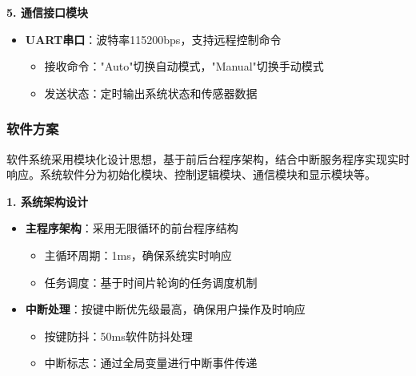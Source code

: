 \textbf{5. 通信接口模块}
\begin{itemize}
    \vspace{-6pt}
  \item \textbf{UART串口}：波特率115200bps，支持远程控制命令
    \begin{itemize}
        \vspace{-3pt}
      \item 接收命令："Auto"切换自动模式，"Manual"切换手动模式
        \vspace{-3pt}
      \item 发送状态：定时输出系统状态和传感器数据
    \end{itemize}
\end{itemize}

\subsubsection{软件方案}

\qquad 软件系统采用模块化设计思想，基于前后台程序架构，结合中断服务程序实现实时响应。系统软件分为初始化模块、控制逻辑模块、通信模块和显示模块等。

\textbf{1. 系统架构设计}
\begin{itemize}
    \vspace{-6pt}
  \item \textbf{主程序架构}：采用无限循环的前台程序结构
    \begin{itemize}
        \vspace{-3pt}
      \item 主循环周期：1ms，确保系统实时响应
        \vspace{-3pt}
      \item 任务调度：基于时间片轮询的任务调度机制
    \end{itemize}
    \vspace{-6pt}
  \item \textbf{中断处理}：按键中断优先级最高，确保用户操作及时响应
    \begin{itemize}
        \vspace{-3pt}
      \item 按键防抖：50ms软件防抖处理
        \vspace{-3pt}
      \item 中断标志：通过全局变量进行中断事件传递
    \end{itemize}
\end{itemize}

